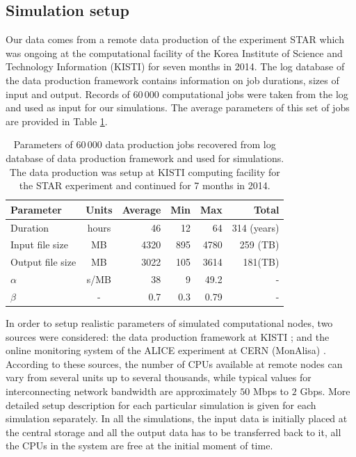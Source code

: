 \documentclass{svjour3}                     %
\begin{document}
\subsection{Simulation setup}
Our data comes from a remote data production of the experiment STAR which was ongoing at the computational facility of the Korea Institute of Science and Technology Information (KISTI)\cite{KISTI} for seven months in 2014. The log database of the data production framework contains information on job durations, sizes of input and output. Records of 60\,000 computational jobs were taken from the log and used as input for our simulations. The average parameters of this set of jobs are provided in Table \ref{tab:jobs}. \begin{table}[b]
\caption{Parameters of 60\,000 data production jobs recovered from log database of data production framework and used for simulations. The data production was setup at KISTI computing facility for the STAR experiment and continued for 7 months in 2014.}
\label{tab:jobs}
\begin{center}
\begin{tabular}{ l  c  r  r  r	|r }
\hline %
  Parameter  & Units& Average & Min & Max & Total \\ \hline %
  Duration & hours & 46 & 12&64&314 (years) \\ 
  Input file size & MB & 4320& 895&4780&259 (TB) \\	
  Output file size & MB & 3022& 105&3614&181(TB) \\
  $\alpha$ & s/MB & 38& 9&49.2&- \\
  $\beta$ & - & 0.7& 0.3& 0.79&-\\	
  \hline %
\end{tabular}
    \end{center}
\end{table}

In order to setup realistic parameters of simulated computational nodes, two sources were considered: the data production framework at KISTI \cite{KISTI-production}; and the online monitoring system of the ALICE experiment at CERN (MonAlisa) \cite{MonAlisa}. According to these sources, the number of CPUs available at remote nodes can vary from several units up to several thousands, while typical values for interconnecting network bandwidth are approximately $50$ Mbps to $2$ Gbps. More detailed setup description for each particular simulation is given for each simulation separately. 
In all the simulations, the input data is initially placed at the central storage and all the output data has to be transferred back to it, all the CPUs in the system are free at the initial moment of time.
\end{document}
